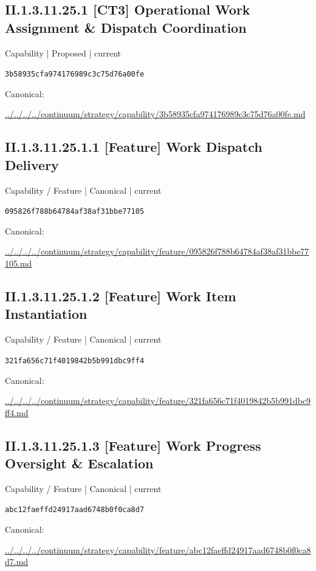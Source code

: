 \documentclass[10pt,a4paper]{article}
\begin{document}
\subsection*{II.1.3.11.25.1 [CT3] Operational Work Assignment \& Dispatch Coordination}
{\small Capability | Proposed | current}\par
\texttt{3b58935cfa974176989c3c75d76a00fe}\par
Canonical: \par
{\footnotesize\url{../../../../continuum/strategy/capability/3b58935cfa974176989c3c75d76a00fe.md}}\par
\subsection*{II.1.3.11.25.1.1 [Feature] Work Dispatch Delivery}
{\small Capability / Feature | Canonical | current}\par
\texttt{095826f788b64784af38af31bbe77105}\par
Canonical: \par
{\footnotesize\url{../../../../continuum/strategy/capability/feature/095826f788b64784af38af31bbe77105.md}}\par
\subsection*{II.1.3.11.25.1.2 [Feature] Work Item Instantiation}
{\small Capability / Feature | Canonical | current}\par
\texttt{321fa656c71f4019842b5b991dbc9ff4}\par
Canonical: \par
{\footnotesize\url{../../../../continuum/strategy/capability/feature/321fa656c71f4019842b5b991dbc9ff4.md}}\par
\subsection*{II.1.3.11.25.1.3 [Feature] Work Progress Oversight \& Escalation}
{\small Capability / Feature | Canonical | current}\par
\texttt{abc12faeffd24917aad6748b0f0ca8d7}\par
Canonical: \par
{\footnotesize\url{../../../../continuum/strategy/capability/feature/abc12faeffd24917aad6748b0f0ca8d7.md}}\par
\end{document}
